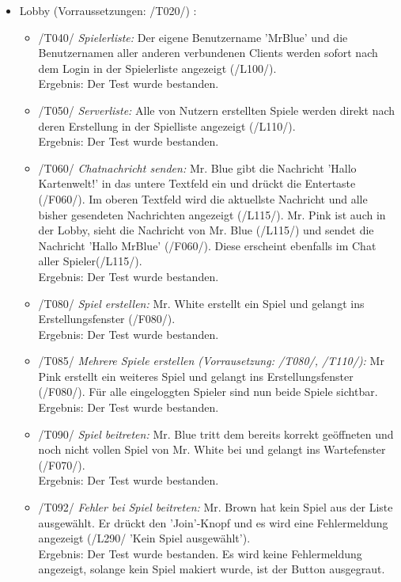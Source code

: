 \documentclass[a4paper]{article}
\begin{document}
\begin{itemize}
\begin{itemize}
	\end{itemize}
	\item Lobby (Vorraussetzungen: /T020/) :
	\begin{itemize}
	
		\item /T040/ \textit{Spielerliste:} Der eigene Benutzername 'MrBlue' und die Benutzernamen aller anderen 					verbundenen Clients werden sofort nach dem Login in der Spielerliste angezeigt (/L100/). \\
		Ergebnis: Der Test wurde bestanden.
		
		\item /T050/ \textit{Serverliste:} Alle von Nutzern erstellten Spiele werden direkt nach deren Erstellung in der Spielliste angezeigt (/L110/). 			\\
		Ergebnis: Der Test wurde bestanden.
		
		\item /T060/ \textit{Chatnachricht senden:} Mr. Blue gibt die Nachricht 'Hallo Kartenwelt!' in das untere Textfeld ein 			und drückt die Entertaste (/F060/). Im oberen Textfeld wird die aktuellste Nachricht und alle bisher gesendeten 				Nachrichten angezeigt (/L115/). Mr. Pink ist auch in der Lobby, sieht die Nachricht von Mr. Blue (/L115/) und 				sendet die Nachricht 'Hallo MrBlue' (/F060/). Diese erscheint ebenfalls im Chat aller Spieler(/L115/). \\
		Ergebnis: Der Test wurde bestanden.
		
		\item /T080/ \textit{Spiel erstellen:} Mr. White erstellt ein Spiel und gelangt ins Erstellungsfenster (/F080/). \\
		Ergebnis: Der Test wurde bestanden.
		
		\item /T085/ \textit{Mehrere Spiele erstellen (Vorrausetzung: /T080/, /T110/):} Mr Pink erstellt ein weiteres Spiel 				und gelangt ins Erstellungsfenster (/F080/). Für alle eingeloggten Spieler sind nun beide Spiele sichtbar. \\
		Ergebnis: Der Test wurde bestanden.
		
		\item /T090/ \textit{Spiel beitreten:} Mr. Blue tritt dem bereits korrekt geöffneten und noch nicht vollen Spiel von Mr. 		White bei und gelangt ins Wartefenster (/F070/). \\
		Ergebnis: Der Test wurde bestanden. 
		
		\item /T092/ \textit{Fehler bei Spiel beitreten:} Mr. Brown hat kein Spiel aus der Liste ausgewählt. Er drückt den 				'Join'-Knopf und es wird eine Fehlermeldung angezeigt (/L290/ 'Kein Spiel ausgewählt'). \\
		Ergebnis: Der Test wurde bestanden. Es wird keine Fehlermeldung angezeigt, solange kein Spiel makiert wurde, ist 			der Button ausgegraut.
		

\end{itemize}
\end{itemize}
\end{document}
